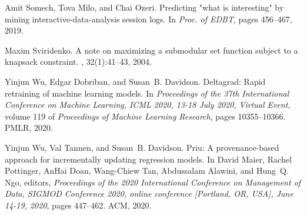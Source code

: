 \documentclass[11pt,dvipdfm]{article}
\begin{document}
\begin{thebibliography}{10}
\begin{small}
Amit Somech, Tova Milo, and Chai Ozeri.
\newblock Predicting "what is interesting" by mining interactive-data-analysis
  session logs.
\newblock In {\em Proc. of EDBT}, pages 456--467, 2019.

Maxim Sviridenko.
\newblock A note on maximizing a submodular set function subject to a knapsack
  constraint.
, 32(1):41--43, 2004.

Yinjun Wu, Edgar Dobriban, and Susan~B. Davidson.
\newblock Deltagrad: Rapid retraining of machine learning models.
\newblock In {\em Proceedings of the 37th International Conference on Machine
  Learning, {ICML} 2020, 13-18 July 2020, Virtual Event}, volume 119 of {\em
  Proceedings of Machine Learning Research}, pages 10355--10366. {PMLR}, 2020.

Yinjun Wu, Val Tannen, and Susan~B. Davidson.
\newblock Priu: {A} provenance-based approach for incrementally updating
  regression models.
\newblock In David Maier, Rachel Pottinger, AnHai Doan, Wang{-}Chiew Tan,
  Abdussalam Alawini, and Hung~Q. Ngo, editors, {\em Proceedings of the 2020
  International Conference on Management of Data, {SIGMOD} Conference 2020,
  online conference [Portland, OR, USA], June 14-19, 2020}, pages 447--462.
  {ACM}, 2020.

\end{small}
\end{thebibliography}
\end{document}
